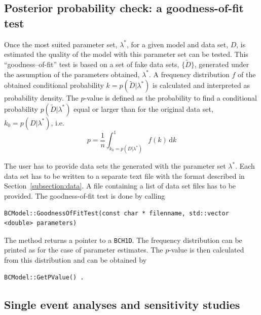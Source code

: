 \documentclass[11pt, a4paper]{article}
\begin{document}
\pagebreak 


\subsection{Posterior probability check: a goodness-of-fit test} 

Once the most suited parameter set, $\lambda^{*}$, for a given model
and data set, $D$, is estimated the quality of the model with this
parameter set can be tested. This ``goodness--of-fit'' test is based
on a set of fake data sets, $\{ \tilde{D} \}$, generated under the
assumption of the parameters obtained, $\lambda^{*}$. A frequency
distribution $f$ of the obtained conditional probability
$k=p(\tilde{D}|\lambda^{*})$ is calculated and interpreted as
probability density. The $p$-value is defined as the probability to
find a conditional probability $p(\tilde{D}|\lambda^{*})$ equal or
larger than for the original data set, $k_{0}=p(D|\lambda^{*})$, i.e.
%
\begin{equation}
p = \frac{1}{n} \int_{k_{0}=p(D|\lambda^{*})}^{1} f(k) \, \mathrm{d}k 
\end{equation} 

\noindent 
The user has to provide data sets the generated with the parameter set
$\lambda^{*}$. Each data set has to be written to a separate text file
with the format described in Section~\ref{subsection:data}. A file
containing a list of data set files has to be provided. The
goodness-of-fit test is done by calling
%
\begin{verbatim}
BCModel::GoodnessOfFitTest(const char * filenname, std::vector <double> parameters) 
\end{verbatim} 

\noindent 
The method returns a pointer to a \verb|BCH1D|. The frequency
distribution can be printed as for the case of parameter
estimates. The $p$-value is then calculated from this distribution and
can be obtained by 
%
\begin{verbatim}
BCModel::GetPValue() . 
\end{verbatim} 


\subsection{Single event analyses and sensitivity studies}
\end{document}
